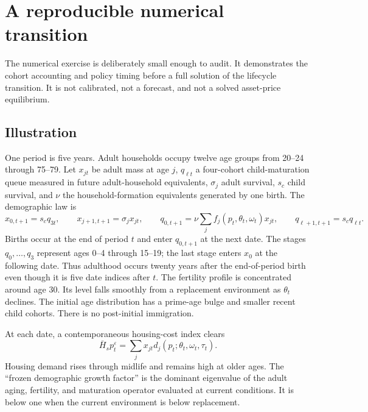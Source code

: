 \documentclass[11pt]{article}
\theoremstyle{definition}
\newcommand{\1}{\mathbf 1}
\begin{document}
\section{A reproducible numerical transition}
\label{sec:numerical_transition}

The numerical exercise is deliberately small enough to audit. It demonstrates
the cohort accounting and policy timing before a full solution of the
lifecycle transition. It is not calibrated, not a forecast, and not a solved
asset-price equilibrium.

\subsection{Illustration}

One period is five years. Adult households occupy twelve age groups from
20--24 through 75--79. Let $x_{jt}$ be adult mass at age $j$, $q_{\ell t}$ a
four-cohort child-maturation queue measured in future adult-household
equivalents, $\sigma_j$ adult survival, $s_c$ child survival, and $\nu$ the
household-formation equivalents generated by one birth. The demographic law is
\begin{equation}
 x_{0,t+1}=s_cq_{3t},\qquad
 x_{j+1,t+1}=\sigma_jx_{jt},\qquad
 q_{0,t+1}=\nu\sum_j f_j(p_t,\theta_t,\omega_t)x_{jt},\qquad
 q_{\ell+1,t+1}=s_cq_{\ell t}.
 \label{eq:numerical_demography}
\end{equation}
Births occur at the end of period $t$ and enter $q_{0,t+1}$ at the next date.
The stages $q_0,\ldots,q_3$ represent ages 0--4 through 15--19; the last stage
enters $x_0$ at the following date. Thus adulthood occurs twenty years after
the end-of-period birth even though it is five date indices after $t$.
The fertility profile is concentrated around age 30. Its level falls smoothly
from a replacement environment as $\theta_t$ declines. The initial age
distribution has a prime-age bulge and smaller recent child cohorts. There is
no post-initial immigration.

At each date, a contemporaneous housing-cost index clears
\begin{equation}
 \bar H_s p_t^{\varepsilon}
 =\sum_j x_{jt}d_j(p_t;\theta_t,\omega_t,\tau_t).
 \label{eq:numerical_clearing}
\end{equation}
Housing demand rises through midlife and remains high at older ages. The
``frozen demographic growth factor'' is the dominant eigenvalue of the adult
aging, fertility, and maturation operator evaluated at current conditions.
It is below one when the current environment is below replacement.
\end{document}
